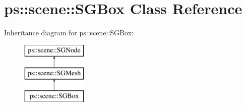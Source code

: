 \hypertarget{classps_1_1scene_1_1SGBox}{}\section{ps\+:\+:scene\+:\+:S\+G\+Box Class Reference}
\label{classps_1_1scene_1_1SGBox}
Inheritance diagram for ps\+:\+:scene\+:\+:S\+G\+Box\+:\begin{figure}[H]
\begin{center}
\leavevmode
\includegraphics[height=3.000000cm]{classps_1_1scene_1_1SGBox}
\end{center}
\end{figure}

